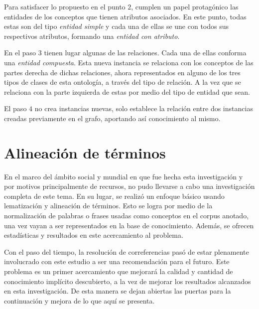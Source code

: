 Para satisfacer lo propuesto en el punto $2$, cumplen un papel protagónico las entidades de los conceptos que tienen atributos asociados. En este punto, todas estas son del tipo \textit{entidad simple} y cada una de ellas se une con todos sus respectivos atributos, formando una \textit{entidad con atributo}.

En el paso $3$ tienen lugar algunas de las relaciones. Cada una de ellas conforma una \textit{entidad compuesta}. Esta nueva instancia se relaciona con los conceptos de las partes derecha de dichas relaciones, ahora representados en alguno de los tres tipos de clases de esta ontología, a través del tipo de relación. A la vez que se relaciona con la parte izquierda de estas por medio del tipo de entidad que sean.

El paso $4$ no crea instancias nuevas, solo establece la relación entre dos instancias creadas previamente en el grafo, aportando así conocimiento al mismo.

\section{Alineación de términos}
En el marco del ámbito social y mundial en que fue hecha esta investigación y por motivos principalmente de recursos, no pudo llevarse a cabo una investigación completa de este tema. En su lugar, se realizó un enfoque básico usando lematización y alineación de términos. Esto se logra por medio de la normalización de palabras o frases usadas como conceptos en el corpus anotado, una vez vayan a ser representados en la base de conocimiento. Además, se ofrecen estadísticas y resultados en este acercamiento al problema.

Con el paso del tiempo, la resolución de correferencias pasó de estar plenamente involucrado con este estudio a ser una recomendación para el futuro. Este problema es un primer acercamiento que mejorará la calidad y cantidad de conocimiento implícito descubierto, a la vez de mejorar los resultados alcanzados en esta investigación. De esta manera se dejan abiertas las puertas para la continuación y mejora de lo que aquí se presenta.
